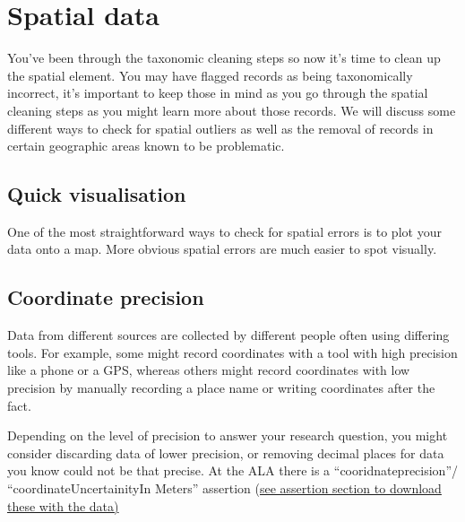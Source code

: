 \documentclass[
  letterpaper,
  DIV=11,
  numbers=noendperiod,
  oneside]{scrreprt}
\begin{document}

\hypertarget{sec-spatial}{%
\chapter{Spatial data}\label{sec-spatial}}

You've been through the taxonomic cleaning steps so now it's time to
clean up the spatial element. You may have flagged records as being
taxonomically incorrect, it's important to keep those in mind as you go
through the spatial cleaning steps as you might learn more about those
records. We will discuss some different ways to check for spatial
outliers as well as the removal of records in certain geographic areas
known to be problematic.

\hypertarget{quick-visualisation}{%
\section{Quick visualisation}\label{quick-visualisation}}

One of the most straightforward ways to check for spatial errors is to
plot your data onto a map. More obvious spatial errors are much easier
to spot visually.

\hypertarget{coordinate-precision}{%
\section{Coordinate precision}\label{coordinate-precision}}

Data from different sources are collected by different people often
using differing tools. For example, some might record coordinates with a
tool with high precision like a phone or a GPS, whereas others might
record coordinates with low precision by manually recording a place name
or writing coordinates after the fact.

Depending on the level of precision to answer your research question,
you might consider discarding data of lower precision, or removing
decimal places for data you know could not be that precise. At the ALA
there is a ``cooridnateprecision''/ ``coordinateUncertainityIn Meters''
assertion (\ul{see assertion section to download these with the data)}
\end{document}
